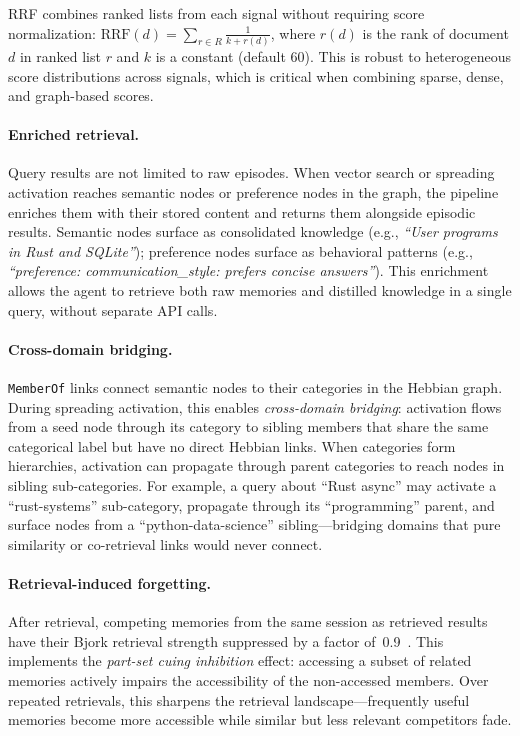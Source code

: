 \noindent RRF combines ranked lists from each signal without requiring
score normalization: $\text{RRF}(d) = \sum_{r \in R} \frac{1}{k + r(d)}$,
where $r(d)$ is the rank of document $d$ in ranked list $r$ and $k$ is a
constant (default 60). This is robust to heterogeneous score distributions
across signals, which is critical when combining sparse, dense, and
graph-based scores.

\paragraph{Enriched retrieval.}
Query results are not limited to raw episodes. When vector search or
spreading activation reaches semantic nodes or preference nodes in the
graph, the pipeline enriches them with their stored content and returns
them alongside episodic results. Semantic nodes surface as consolidated
knowledge (e.g., \emph{``User programs in Rust and SQLite''}); preference
nodes surface as behavioral patterns (e.g., \emph{``preference:
communication\_style: prefers concise answers''}). This enrichment
allows the agent to retrieve both raw memories and distilled knowledge in
a single query, without separate API calls.

\paragraph{Cross-domain bridging.}
\texttt{MemberOf} links connect semantic nodes to their categories in the
Hebbian graph. During spreading activation, this enables \emph{cross-domain
bridging}: activation flows from a seed node through its category to
sibling members that share the same categorical label but have no direct
Hebbian links. When categories form hierarchies, activation can propagate
through parent categories to reach nodes in sibling sub-categories. For
example, a query about ``Rust async'' may activate a ``rust-systems''
sub-category, propagate through its ``programming'' parent, and surface
nodes from a ``python-data-science'' sibling---bridging domains that pure
similarity or co-retrieval links would never connect.

\paragraph{Retrieval-induced forgetting.}
After retrieval, competing memories from the same session as retrieved
results have their Bjork retrieval strength suppressed by a factor
of~0.9~\cite{anderson1994}. This implements the \emph{part-set cuing
inhibition} effect: accessing a subset of related memories actively
impairs the accessibility of the non-accessed members. Over repeated
retrievals, this sharpens the retrieval landscape---frequently useful
memories become more accessible while similar but less relevant
competitors fade.
